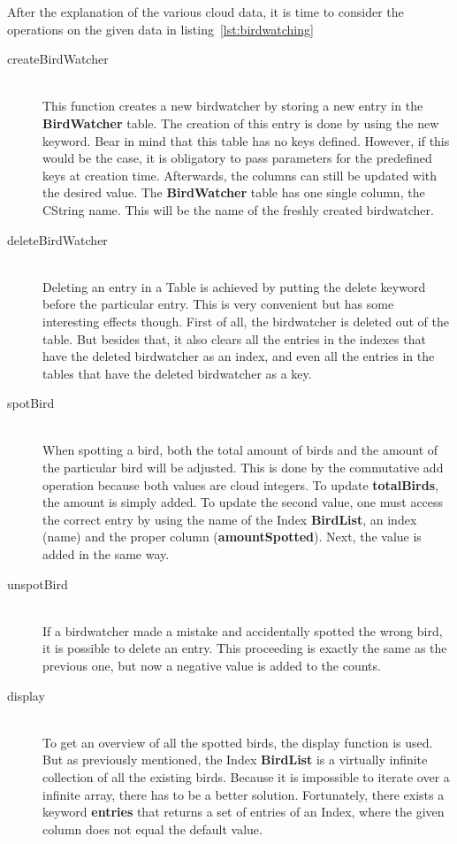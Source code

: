 \documentclass[a4paper,12pt]{report}
\begin{document}
After the explanation of the various cloud data, it is time to consider the operations on the given data in listing~\ref{lst:birdwatching}  

\begin{description}
    \item[createBirdWatcher] \hfill \\This function creates a new birdwatcher by storing a new entry in the \textbf{BirdWatcher} table. The creation of this entry is done by using the new keyword. Bear in mind that this table has no keys defined. However, if this would be the case, it is obligatory to pass parameters for the predefined keys at creation time. Afterwards, the columns can still be updated with the desired value. The \textbf{BirdWatcher} table has one single column, the \textcolor{codedarkblue}{CString} name. This will be the name of the freshly created birdwatcher.
    \item[deleteBirdWatcher] \hfill \\Deleting an entry in a \textcolor{codeblue}{Table} is achieved by putting the delete keyword before the particular entry. This is very convenient but has some interesting effects though. First of all, the birdwatcher is deleted out of the table. But besides that, it also clears all the entries in the indexes that have the deleted birdwatcher as an index, and even all the entries in the tables that have the deleted birdwatcher as a key.
    \item[spotBird] \hfill \\When spotting a bird, both the total amount of birds and the amount of the particular bird will be adjusted. This is done by the commutative add operation because both values are cloud integers. To update \textbf{totalBirds}, the amount is simply added. To update the second value, one must access the correct entry by using the name of the \textcolor{codeblue}{Index} \textbf{BirdList}, an index (name) and the proper column (\textbf{amountSpotted}). Next, the value is added in the same way.  
    \item[unspotBird] \hfill \\If a birdwatcher made a mistake and accidentally spotted the wrong bird, it is possible to delete an entry. This proceeding is exactly the same as the previous one, but now a negative value is added to the counts. 
    \item[display] \hfill \\To get an overview of all the spotted birds, the display function is used. But as previously mentioned, the \textcolor{codeblue}{Index} \textbf{BirdList} is a virtually infinite collection of all the existing birds. Because it is impossible to iterate over a infinite array, there has to be a better solution. Fortunately, there exists a keyword \textbf{entries} that returns a set of entries of an \textcolor{codeblue}{Index}, where the given column does not equal the default value.
\end{description}
\end{document}
